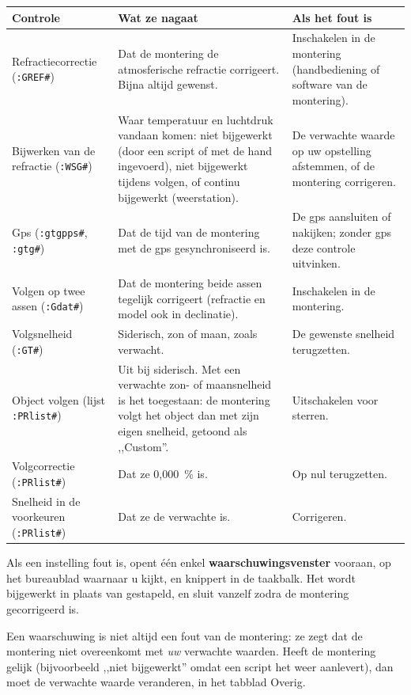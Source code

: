 \begin{center}
\begin{tabularx}{\textwidth}{p{3.3cm}Xp{4.2cm}}
\toprule
\textbf{Controle} & \textbf{Wat ze nagaat} & \textbf{Als het fout is} \\
\midrule
Refractiecorrectie (\texttt{:GREF\#}) & Dat de montering de atmosferische
refractie corrigeert. Bijna altijd gewenst. & Inschakelen in de montering
(handbediening of software van de montering). \\
Bijwerken van de refractie (\texttt{:WSG\#}) & Waar temperatuur en luchtdruk
vandaan komen: niet bijgewerkt (door een script of met de hand ingevoerd), niet
bijgewerkt tijdens volgen, of continu bijgewerkt (weerstation). & De verwachte
waarde op uw opstelling afstemmen, of de montering corrigeren. \\
Gps (\texttt{:gtgpps\#}, \texttt{:gtg\#}) & Dat de tijd van de montering met
de gps gesynchroniseerd is. & De gps aansluiten of nakijken; zonder gps deze
controle uitvinken. \\
Volgen op twee assen (\texttt{:Gdat\#}) & Dat de montering beide assen tegelijk
corrigeert (refractie en model ook in declinatie). & Inschakelen in de
montering. \\
Volgsnelheid (\texttt{:GT\#}) & Siderisch, zon of maan, zoals verwacht. & De
gewenste snelheid terugzetten. \\
Object volgen (lijst \texttt{:PRlist\#}) & Uit bij siderisch. Met een verwachte
zon- of maansnelheid is het toegestaan: de montering volgt het object dan met
zijn eigen snelheid, getoond als ,,Custom''. & Uitschakelen voor sterren. \\
Volgcorrectie (\texttt{:PRlist\#}) & Dat ze 0,000~\% is. & Op nul
terugzetten. \\
Snelheid in de voorkeuren (\texttt{:PRlist\#}) & Dat ze de verwachte is. &
Corrigeren. \\
\bottomrule
\end{tabularx}
\end{center}

Als een instelling fout is, opent één enkel \textbf{waarschuwingsvenster}
vooraan, op het bureaublad waarnaar u kijkt, en knippert in de taakbalk. Het
wordt bijgewerkt in plaats van gestapeld, en sluit vanzelf zodra de montering
gecorrigeerd is.


\begin{tip}
Een waarschuwing is niet altijd een fout van de montering: ze zegt dat de
montering niet overeenkomt met \emph{uw} verwachte waarden. Heeft de montering
gelijk (bijvoorbeeld ,,niet bijgewerkt'' omdat een script het weer aanlevert),
dan moet de verwachte waarde veranderen, in het tabblad Overig.
\end{tip}

